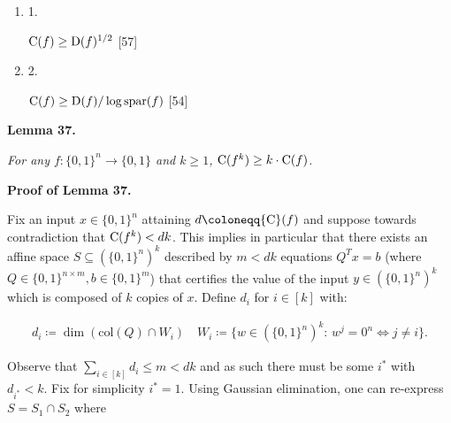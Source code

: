 \begin{enumerate}


\item[] 
1. 


${\textup{C}}(f)\geq{\textup{D}}(f)^{1/2}$ [57]\par





\item[] 
2. 


${\textup{C}}(f)\geq{\textup{D}}(f)/\log\mathrm{spar}(f)$ [54]\par





\end{enumerate}





\par\medskip\noindent\textbf{
\textbf{Lemma 37}\textbf{.}
}\par



\emph{For any $f\colon\{0,1\}^{n}\to\{0,1\}$ and $k\geq 1$, ${\textup{C}}(f^{k})\geq k\cdot{\textup{C}}(f)$.}\par






\par\medskip\noindent\textbf{Proof of Lemma 37.}\par




Fix an input $x\in\{0,1\}^{n}$ attaining $d\coloneqq{\textup{C}}(f)$ and suppose towards contradiction that ${\textup{C}}(f^{k})<dk$. This implies in particular that there exists an affine space $S\subseteq(\{0,1\}^{n})^{k}$ described by $m<dk$ equations $Q^{T}x=b$ (where $Q\in\{0,1\}^{n\times m},b\in\{0,1\}^{m}$) that certifies the value of the input $y\in(\{0,1\}^{n})^{k}$ which is composed of $k$ copies of $x$. Define $d_{i}$ for $i\in[k]$ with:\par


\[\begin{gathered}
d_{i}\coloneqq\dim(\mathrm{col}(Q)\cap W_{i})\quad W_{i}\coloneqq\{w\in(\{0,1\}^{n})^{k}:\,w^{j}=0^{n}\iff j\neq i\}.
\end{gathered}\]


Observe that $\sum_{i\in[k]}d_{i}\leq m<dk$ and as such there must be some $i^{*}$ with $d_{i^{*}}<k$. Fix for simplicity $i^{*}=1$. Using Gaussian elimination, one can re-express $S=S_{1}\cap S_{2}$ where\par


